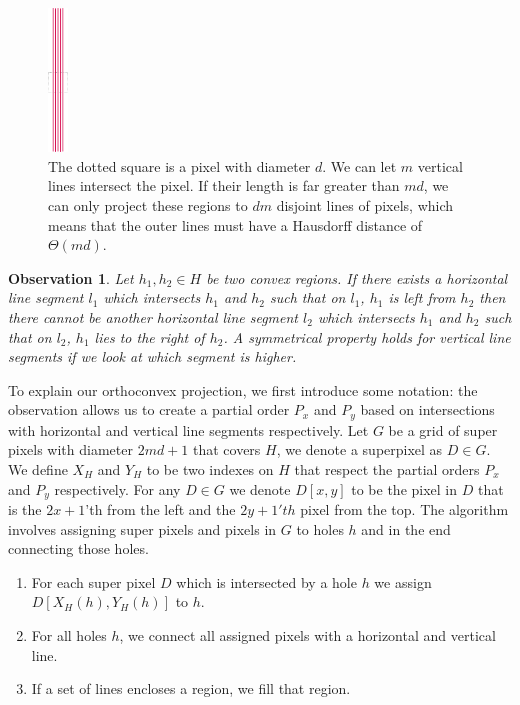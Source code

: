 \documentclass{paper}
\newtheorem{observation}{Observation}
\begin{document}
{\begin{figure}[H]
\centering
\includegraphics[width=20px]{Figures/linesexample.png}
\caption{The dotted square is a pixel with diameter $d$. We can let $m$ vertical lines intersect the pixel. If their length is far greater than $md$, we can only project these regions to $dm$ disjoint lines of pixels, which means that the outer lines must have a Hausdorff distance of $\Theta(md)$.}
\label{fig:linesexample}
\end{figure}


\begin{observation}
Let $h_1,h_2 \in H$ be two convex regions. If there exists a horizontal line segment $l_1$ which intersects $h_1$ and $h_2$ such that on $l_1$, $h_1$ is left from $h_2$ then there cannot be another horizontal line segment $l_2$ which intersects $h_1$ and $h_2$ such that on $l_2$, $h_1$ lies to the right of $h_2$. A symmetrical property holds for vertical line segments if we look at which segment is higher.
\end{observation}

To explain our orthoconvex projection, we first introduce some notation: the observation allows us to create a partial order $P_x$ and $P_y$ based on intersections with horizontal and vertical line segments respectively. Let $G$ be a grid of super pixels with diameter $2md+1$ that covers $H$, we denote a superpixel as $D \in G$. We define $X_H$ and $Y_H$ to be two indexes on $H$ that respect the partial orders $P_x$ and $P_y$ respectively. For any $D \in G$ we denote $D[x,y]$ to be the pixel in $D$ that is the $2x+1$'th from the left and the $2y+1'th$ pixel from the top. The algorithm involves assigning super pixels and pixels in $G$ to holes $h$ and in the end connecting those holes.

\begin{enumerate}
\item For each super pixel $D$ which is intersected by a hole $h$ we assign $D[X_H(h), Y_H(h)]$ to $h$.
\item For all holes $h$, we connect all assigned pixels with a horizontal and vertical line. 
\item If a set of lines encloses a region, we fill that region.
\end{enumerate}


}
\end{document}
